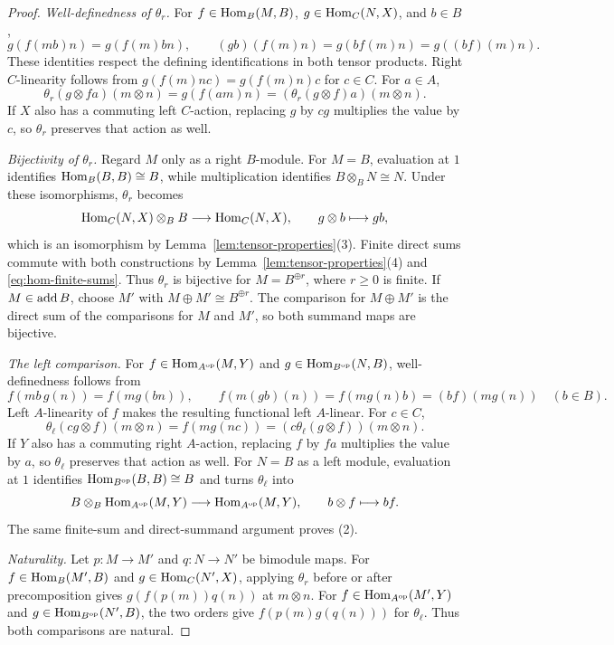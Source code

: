 \begin{advanced}
\begin{proof}
\emph{Well-definedness of $\theta_r$.}
For $f\in\operatorname{Hom}\nolimits_B(M,B)$, $g\in\operatorname{Hom}\nolimits_C(N,X)$, and $b\in B$,
\[
g(f(mb)n)=g(f(m)bn),\qquad
(gb)(f(m)n)=g(bf(m)n)=g((bf)(m)n).
\]
These identities respect the defining identifications in both tensor products.
Right $C$-linearity follows from $g(f(m)nc)=g(f(m)n)c$ for $c\in C$.
For $a\in A$,
\[
\theta_r(g\otimes fa)(m\otimes n)
=g(f(am)n)=(\theta_r(g\otimes f)a)(m\otimes n).
\]
If $X$ also has a commuting left $C$-action, replacing $g$ by $cg$ multiplies the value by $c$, so $\theta_r$ preserves that action as well.

\emph{Bijectivity of $\theta_r$.}
Regard $M$ only as a right $B$-module.
For $M=B$, evaluation at $1$ identifies $\operatorname{Hom}\nolimits_B(B,B)\cong B$, while multiplication identifies $B\otimes_B N\cong N$.
Under these isomorphisms, $\theta_r$ becomes
\[
\operatorname{Hom}\nolimits_C(N,X)\otimes_B B\longrightarrow\operatorname{Hom}\nolimits_C(N,X),
\qquad g\otimes b\longmapsto gb,
\]
which is an isomorphism by Lemma~\ref{lem:tensor-properties}(3).
Finite direct sums commute with both constructions by Lemma~\ref{lem:tensor-properties}(4) and \eqref{eq:hom-finite-sums}.
Thus $\theta_r$ is bijective for $M=B^{\oplus r}$, where $r\geq0$ is finite.
If $M\in\operatorname{add} B$, choose $M'$ with $M\oplus M'\cong B^{\oplus r}$.
The comparison for $M\oplus M'$ is the direct sum of the comparisons for $M$ and $M'$, so both summand maps are bijective.

\emph{The left comparison.}
For $f\in\operatorname{Hom}\nolimits_{A^{\mathrm{op}}}(M,Y)$ and $g\in\operatorname{Hom}\nolimits_{B^{\mathrm{op}}}(N,B)$, well-definedness follows from
\[
f(mb\,g(n))=f(mg(bn)),\qquad
f(m(gb)(n))=f(mg(n)b)=(bf)(mg(n))
\quad(b\in B).
\]
Left $A$-linearity of $f$ makes the resulting functional left $A$-linear.
For $c\in C$,
\[
\theta_\ell(cg\otimes f)(m\otimes n)
=f(mg(nc))=(c\theta_\ell(g\otimes f))(m\otimes n).
\]
If $Y$ also has a commuting right $A$-action, replacing $f$ by $fa$ multiplies the value by $a$, so $\theta_\ell$ preserves that action as well.
For $N=B$ as a left module, evaluation at $1$ identifies $\operatorname{Hom}\nolimits_{B^{\mathrm{op}}}(B,B)\cong B$ and turns $\theta_\ell$ into
\[
B\otimes_B\operatorname{Hom}\nolimits_{A^{\mathrm{op}}}(M,Y)\longrightarrow\operatorname{Hom}\nolimits_{A^{\mathrm{op}}}(M,Y),
\qquad b\otimes f\longmapsto bf.
\]
The same finite-sum and direct-summand argument proves (2).

\emph{Naturality.}
Let $p:M\to M'$ and $q:N\to N'$ be bimodule maps.
For $f\in\operatorname{Hom}\nolimits_B(M',B)$ and $g\in\operatorname{Hom}\nolimits_C(N',X)$, applying $\theta_r$ before or after precomposition gives $g(f(p(m))q(n))$ at $m\otimes n$.
For $f\in\operatorname{Hom}\nolimits_{A^{\mathrm{op}}}(M',Y)$ and $g\in\operatorname{Hom}\nolimits_{B^{\mathrm{op}}}(N',B)$, the two orders give $f(p(m)g(q(n)))$ for $\theta_\ell$.
Thus both comparisons are natural.
\end{proof}


\end{advanced}

